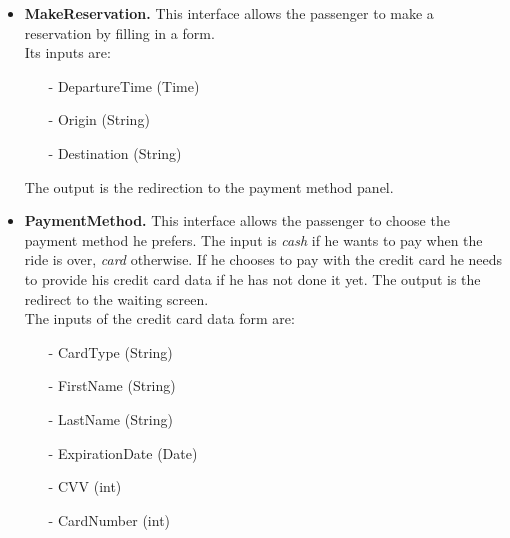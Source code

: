 \begin{itemize}
	\item \textbf{MakeReservation.}
		This interface allows the passenger to make a reservation by filling in a form.\\ Its inputs are:
		\begin{itemize} 
			\item[-] DepartureTime (Time)
			\item[-] Origin (String)
			\item[-] Destination (String)
		\end{itemize}
		The output is the redirection to the payment method panel.
	\item \textbf{PaymentMethod.}
		This interface allows the passenger to choose the payment method he prefers. The input is \textit{cash} if he wants to pay when the ride is over, \textit{card} otherwise. If he chooses to pay with the credit card he needs to provide his credit card data if he has not done it yet. The output is the redirect to the waiting screen.\\ The inputs of the credit card data form are: 
		\begin{itemize} 
			\item[-] CardType (String)
			\item[-] FirstName (String)
			\item[-] LastName (String)
			\item[-] ExpirationDate (Date)
			\item[-] CVV (int)
			\item[-] CardNumber (int)
		\end{itemize}
\end{itemize}